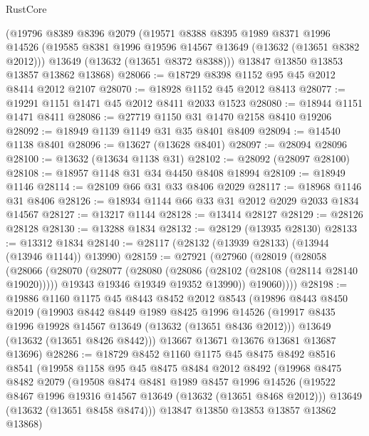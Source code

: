 \begin{lexlean}{RustCore}
\begin{coremodule}
    (@19796
      @8389
      @8396
      @2079
      (@19571
        @8388
        @8395
        @1989
        @8371
        @1996
        @14526
        (@19585 @8381 @1996 @19596 @14567 @13649 (@13632 (@13651 @8382 @2012)))
        @13649
        (@13632 (@13651 @8372 @8388)))
      @13847
      @13850
      @13853
      @13857
      @13862
      @13868)
@28066 := @18729 @8398 @1152 @95 @45 @2012 @8414 @2012 @2107
@28070 := @18928 @1152 @45 @2012 @8413
@28077 := @19291 @1151 @1471 @45 @2012 @8411 @2033 @1523
@28080 := @18944 @1151 @1471 @8411
@28086 := @27719 @1150 @31 @1470 @2158 @8410 @19206
@28092 := @18949 @1139 @1149 @31 @35 @8401 @8409
@28094 := @14540 @1138 @8401
@28096 := @13627 (@13628 @8401)
@28097 := @28094 @28096
@28100 := @13632 (@13634 @1138 @31)
@28102 := @28092 (@28097 @28100)
@28108 := @18957 @1148 @31 @34 @4450 @8408 @18994
@28109 := @18949 @1146
@28114 := @28109 @66 @31 @33 @8406 @2029
@28117 := @18968 @1146 @31 @8406
@28126 := @18934 @1144 @66 @33 @31 @2012 @2029 @2033 @1834 @14567
@28127 := @13217 @1144
@28128 := @13414 @28127
@28129 := @28126 @28128
@28130 := @13288 @1834
@28132 := @28129 (@13935 @28130)
@28133 := @13312 @1834
@28140 := @28117 (@28132 (@13939 @28133) (@13944 (@13946 @1144)) @13990)
@28159 := @27921
    (@27960
      (@28019
        (@28058
          (@28066
            (@28070
              (@28077
                (@28080 (@28086 (@28102 (@28108 (@28114 @28140 @19020)))))
                @19343
                @19346
                @19349
                @19352
                @13990))
            @19060))))
@28198 := @19886
    @1160
    @1175
    @45
    @8443
    @8452
    @2012
    @8543
    (@19896
      @8443
      @8450
      @2019
      (@19903
        @8442
        @8449
        @1989
        @8425
        @1996
        @14526
        (@19917 @8435 @1996 @19928 @14567 @13649 (@13632 (@13651 @8436 @2012)))
        @13649
        (@13632 (@13651 @8426 @8442)))
      @13667
      @13671
      @13676
      @13681
      @13687
      @13696)
@28286 := @18729
    @8452
    @1160
    @1175
    @45
    @8475
    @8492
    @8516
    @8541
    (@19958
      @1158
      @95
      @45
      @8475
      @8484
      @2012
      @8492
      (@19968
        @8475
        @8482
        @2079
        (@19508
          @8474
          @8481
          @1989
          @8457
          @1996
          @14526
          (@19522 @8467 @1996 @19316 @14567 @13649 (@13632 (@13651 @8468 @2012)))
          @13649
          (@13632 (@13651 @8458 @8474)))
        @13847
        @13850
        @13853
        @13857
        @13862
        @13868)

\end{coremodule}
\end{lexlean}
